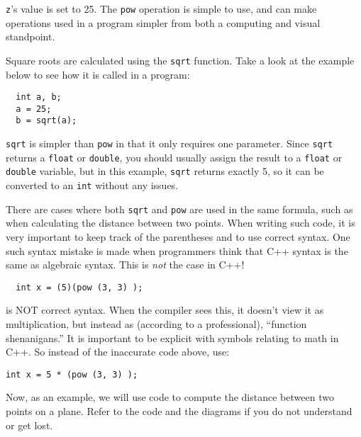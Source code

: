 	\texttt{z}'s value is set to 25. 
	The \texttt{pow} operation is simple to use, and can make operations used in a program simpler from both a computing and visual standpoint.

	Square roots are calculated using the \texttt{sqrt} function. 
	Take a look at the example below to see how it is called in a program:

\begin{lstlisting}
  int a, b;
  a = 25;
  b = sqrt(a);
\end{lstlisting}


	\texttt{sqrt} is simpler than \texttt{pow} in that it only requires one parameter. 
	Since \texttt{sqrt} returns a \texttt{float} or \texttt{double}, you should usually assign the result to a \texttt{float} or \texttt{double} variable, but in this example, \texttt{sqrt} returns exactly 5, so it can be converted to an \texttt{int} without any issues. 
	
	There are cases where both \texttt{sqrt} and \texttt{pow} are used in the same formula, such as when calculating the distance between two points. 
	When writing such code, it is very important to keep track of the parentheses and to use correct syntax. 
	One such syntax mistake is made when programmers think that C++ syntax is the same as algebraic syntax. 
	This is \emph{not} the case in C++!

\begin{lstlisting}
  int x = (5)(pow (3, 3) );
\end{lstlisting}

is NOT correct syntax. 
When the compiler sees this, it doesn't view it as multiplication, but instead as (according to a professional), ``function shenanigans.'' 
It is important to be explicit with symbols relating to math in C++. 
So instead of the inaccurate code above, use:

\begin{lstlisting}
int x = 5 * (pow (3, 3) );
\end{lstlisting}

	Now, as an example, we will use code to compute the distance between two points on a plane.
	 Refer to the code and the diagrams if you do not understand or get lost.

